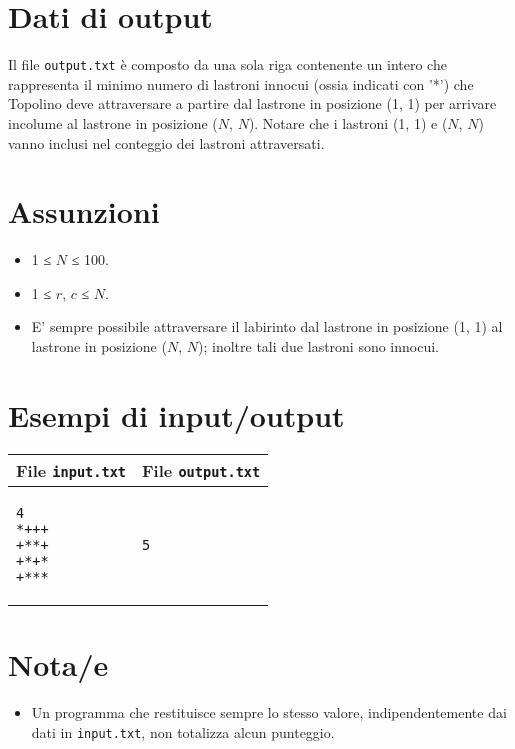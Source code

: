 \documentclass[a4paper,11pt]{article}
\begin{document}
\section*{Dati di output}
  
Il file \texttt{output.txt} è composto da una sola riga
contenente un intero che rappresenta il minimo numero di lastroni
innocui (ossia indicati con '*') che Topolino deve attraversare a
partire dal lastrone in posizione (1, 1) per arrivare incolume al
lastrone in posizione ($N$, $N$). Notare che i
lastroni (1, 1) e ($N$, $N$) vanno inclusi nel
conteggio dei lastroni attraversati.

  \section*{Assunzioni}
  \begin{itemize}
  
    \item  1 ≤ $N$ ≤ 100.
    \item  1 ≤ $r$, $c$ ≤ $N$.
    \item  E' sempre possibile attraversare il labirinto dal lastrone in
posizione (1, 1) al lastrone in posizione ($N$, $N$);
inoltre tali due lastroni sono innocui.
  \end{itemize}

\section*{Esempi di input/output}

  
    \noindent
    \begin{tabular}{p{11cm}|p{5cm}}
    \toprule
    \textbf{File \texttt{input.txt}}
    & \textbf{File \texttt{output.txt}}
    \\
    \midrule
    \scriptsize
    \begin{verbatim}
4
*+++
+**+
+*+*
+***
\end{verbatim}
    &
    \scriptsize
    \begin{verbatim}
5
\end{verbatim}
    \\
    \bottomrule
    \end{tabular}
  
\section*{Nota/e}
\begin{itemize}
  
    \item Un programma che restituisce sempre lo stesso valore,
indipendentemente dai dati in \texttt{input.txt}, non totalizza
alcun punteggio.
\end{itemize}
\end{document}
